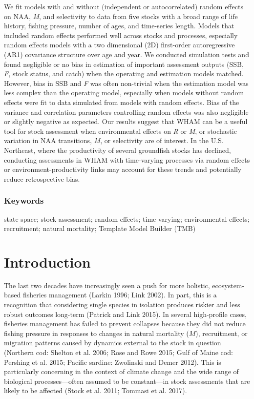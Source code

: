 \documentclass[]{article}
\begin{document}
We fit models with and without (independent or autocorrelated) random
effects on NAA, \emph{M}, and selectivity to data from five stocks with
a broad range of life history, fishing pressure, number of ages, and
time-series length. Models that included random effects performed well
across stocks and processes, especially random effects models with a two
dimensional (2D) first-order autoregressive (AR1) covariance structure
over age and year. We conducted simulation tests and found negligible or
no bias in estimation of important assessment outputs (SSB, \emph{F},
stock status, and catch) when the operating and estimation models
matched. However, bias in SSB and \emph{F} was often non-trivial when
the estimation model was less complex than the operating model,
especially when models without random effects were fit to data simulated
from models with random effects. Bias of the variance and correlation
parameters controlling random effects was also negligible or slightly
negative as expected. Our results suggest that WHAM can be a useful tool
for stock assessment when environmental effects on \emph{R} or \emph{M},
or stochastic variation in NAA transitions, \emph{M}, or selectivity are
of interest. In the U.S. Northeast, where the productivity of several
groundfish stocks has declined, conducting assessments in WHAM with
time-varying processes via random effects or environment-productivity
links may account for these trends and potentially reduce retrospective
bias.

\hypertarget{keywords}{%
\subsubsection*{Keywords}\label{keywords}}

state-space; stock assessment; random effects; time-varying;
environmental effects; recruitment; natural mortality; Template Model
Builder (TMB)

\pagebreak

\hypertarget{introduction}{%
\section{Introduction}\label{introduction}}

The last two decades have increasingly seen a push for more holistic,
ecosystem-based fisheries management (Larkin 1996; Link 2002). In part,
this is a recognition that considering single species in isolation
produces riskier and less robust outcomes long-term (Patrick and Link
2015). In several high-profile cases, fisheries management has failed to
prevent collapses because they did not reduce fishing pressure in
responses to changes in natural mortality (\(M\)), recruitment, or
migration patterns caused by dynamics external to the stock in question
(Northern cod: Shelton et al. 2006; Rose and Rowe 2015; Gulf of Maine
cod: Pershing et al. 2015; Pacific sardine: Zwolinski and Demer 2012).
This is particularly concerning in the context of climate change and the
wide range of biological processes---often assumed to be constant---in
stock assessments that are likely to be affected (Stock et al. 2011;
Tommasi et al. 2017).
\end{document}
